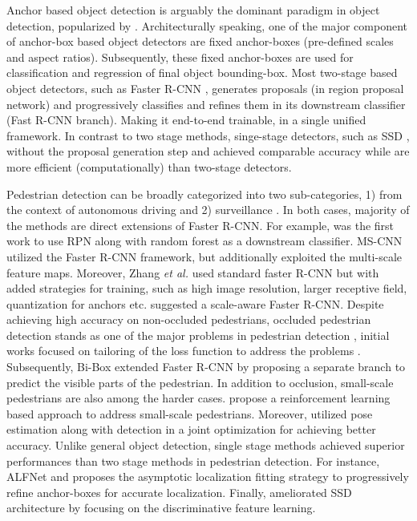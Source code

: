 \documentclass[review]{elsarticle}
\begin{document}
Anchor based object detection is arguably the dominant paradigm in object detection, popularized by \cite{ren2015faster}. Architecturally speaking, one of the major component of anchor-box based object detectors are fixed anchor-boxes (pre-defined scales and aspect ratios).  Subsequently, these fixed anchor-boxes are used for classification and regression of final object bounding-box. Most two-stage based object detectors, such as Faster R-CNN \cite{ren2015faster}, generates proposals (in region proposal network) and progressively classifies and refines them in its downstream classifier (Fast R-CNN branch). Making it end-to-end trainable, in a single unified framework. In contrast to two stage methods, singe-stage detectors, such as SSD \cite{liu2016ssd}, without the proposal generation step and achieved comparable accuracy while are more efficient (computationally) than two-stage detectors.     






Pedestrian detection can be broadly categorized into two sub-categories, 1) from the context of autonomous driving \cite{zhang2017citypersons} and 2) surveillance \cite{qian2019oriented}. In both cases, majority of the methods are direct extensions of Faster R-CNN. For example, \cite{zhang2016faster} was the first work to use RPN \cite{ren2015faster} along with random forest as a downstream classifier. MS-CNN \cite{cai2016unified} utilized the Faster R-CNN framework, but additionally exploited the multi-scale feature maps. Moreover, Zhang \emph{et al.} \cite{zhang2017citypersons} used standard faster R-CNN but with added strategies for training, such as high image resolution, larger receptive field, quantization for anchors etc. \cite{qian2019oriented} suggested a scale-aware Faster R-CNN. Despite achieving high accuracy on non-occluded pedestrians, occluded pedestrian detection stands as one of the major problems in pedestrian detection \cite{hasan2021generalizable}, initial works focused on tailoring of the loss function to address the problems \cite{wang2017repulsion,Zhang_2018_ECCV}. Subsequently, Bi-Box \cite{Zhou_2018_ECCV} extended Faster R-CNN by proposing a separate branch to predict the visible parts of the pedestrian. In addition to occlusion, small-scale pedestrians are also among the harder cases. \cite{zhang2018too} propose a reinforcement learning based approach to address small-scale pedestrians. Moreover,  \cite{zhao2019accurate} utilized pose estimation along with detection in a joint optimization for achieving better accuracy.
Unlike general object detection, single stage methods\cite{lee2020centermask,tian2019fcos} achieved superior performances than two stage methods in pedestrian detection. For instance, ALFNet \cite{Liu_2018_ECCV} and \cite{liu2019efficient} proposes the asymptotic localization fitting strategy to progressively refine anchor-boxes for accurate localization. Finally, \cite{Lin_2018_ECCV} ameliorated SSD architecture by focusing on the discriminative feature learning. 
\end{document}
